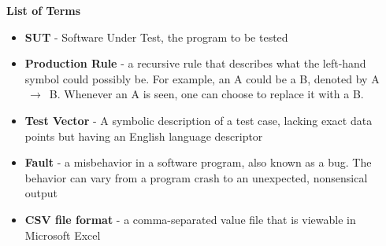 \thispagestyle{plain}
\newpage
\begin{center}

\textbf{List of Terms}

\vspace{.5cm}

\begin{itemize}
\item []\textbf{SUT} - Software Under Test, the program to be tested
\item []\textbf{Production Rule} - a recursive rule that describes what the left-hand symbol could possibly be. For example, an A could be a B, denoted by A $\,\to\,$ B. Whenever an A is seen, one can choose to replace it with a B.
\item []\textbf{Test Vector} - A symbolic description of a test case, lacking exact data points but having an English language descriptor
\item []\textbf{Fault} - a misbehavior in a software program, also known as a bug. The behavior can vary from a program crash to an unexpected, nonsensical output
\item []\textbf{CSV file format} - a comma-separated value file that is viewable in Microsoft Excel
\end{itemize}
\end{center}

\newpage